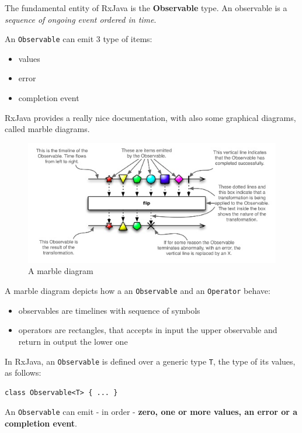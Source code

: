 The fundamental entity of RxJava is the \textbf{Observable} type. An
observable is a \emph{sequence of ongoing event ordered in time}.

An \texttt{Observable} can emit 3 type of items:

\begin{itemize}
\itemsep1pt\parskip0pt
\item
  values
\item
  error
\item
  completion event
\end{itemize}

RxJava provides a really nice documentation, with also some graphical
diagrams, called marble diagrams.

\begin{figure}[htbp]
\centering
\includegraphics[scale=0.75]{imgs/marble.png}
\caption{A marble diagram}
\end{figure}

A marble diagram depicts how a an \texttt{Observable} and an
\texttt{Operator} behave:

\begin{itemize}
\itemsep1pt\parskip0pt
\item
  observables are timelines with sequence of symbols
\item
  operators are rectangles, that accepts in input the upper observable
  and return in output the lower one
\end{itemize}

In RxJava, an \texttt{Observable} is defined over a generic type
\texttt{T}, the type of its values, as follows:

\begin{verbatim}
class Observable<T> { ... }
\end{verbatim}

An \texttt{Observable} can emit - in order - \textbf{zero, one or more
values, an error or a completion event}.

